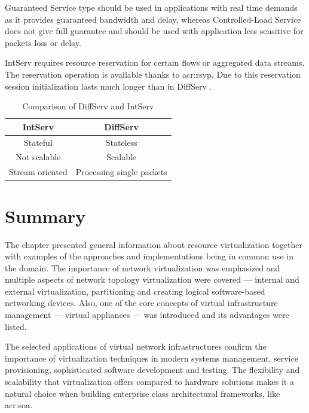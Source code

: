 \documentclass[11pt,openany]{book}
\begin{document}
        Guaranteed Service type should be used in applications with real time demands as it provides guaranteed
        bandwidth and delay, whereas Controlled-Load Service does not give full guarantee and should be used with
        application less sensitive for packets loss or delay.

        IntServ requires resource reservation for certain flows or aggregated data streams. The reservation operation is
        available thanks to \gls{acr:rsvp}. Due to this reservation session initialization lasts much longer than in
        DiffServ \cite{qos2}.

        \begin{table}[ht]
          \centering
          \begin{tabular}{|c|c|}
            \hline
            IntServ         & DiffServ \\
            \hline \hline
            Stateful        & Stateless \\
            \hline
            Not scalable    & Scalable \\
            \hline
            Stream oriented & Processing single packets \\
            \hline
          \end{tabular}

          \caption{Comparison of DiffServ and IntServ}
        \end{table}


    \section*{Summary}

      The chapter presented general information about resource virtualization together with examples of the approaches and
      implementations being in common use in the domain. The importance of network virtualization was emphasized and
      multiple aspects of network topology virtualization were covered --- internal and external virtualization,
      partitioning and creating logical software-based networking devices. Also, one of the core concepts of virtual
      infrastructure management --- virtual appliances --- was introduced and its advantages were listed.

      The selected applications of virtual network infrastructures confirm the importance of virtualization techniques
      in modern systems management, service provisioning, sophisticated software development and testing. The
      flexibility and scalability that virtualization offers compared to hardware solutions makes it a natural choice when
      building enterprise class architectural frameworks, like \gls{acr:soa}.
\end{document}
